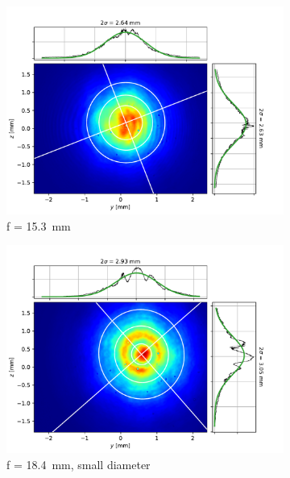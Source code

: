 \begin{figure}[t!]
    \begin{subfigure}{0.5\textwidth}
        \includegraphics[width=\textwidth]{chapters/chapter_3/figures/beam_f15.3.pdf}
        \caption{f = \SI{15.3}{mm}}
        \label{fig:beam_f15.3}
    \end{subfigure}
    \begin{subfigure}{0.5\textwidth}
        \centering
        \includegraphics[width=\textwidth]{chapters/chapter_3/figures/beam_f18.4_small.pdf}
        \caption{f = \SI{18.4}{mm}, small diameter}
        \label{fig:beam_f18.4_small}
    \end{subfigure}
    \begin{subfigure}{0.5\textwidth}

\end{subfigure}
\end{figure}
